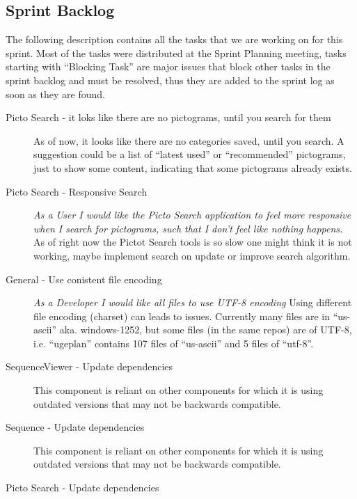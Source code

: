\subsection{Sprint Backlog}
The following description contains all the tasks that we are working on for this sprint.
Most of the tasks were distributed at the Sprint Planning meeting, tasks starting with ``Blocking Task'' are major issues that block other tasks in the sprint backlog and must be resolved, thus they are added to the sprint log as soon as they are found.

\begin{description}
    \item[Picto Search - it loks like there are no pictograms, until you search for them]
        As of now, it looks like there are no categories saved, until you search.
        A suggestion could be a list of ``latest used'' or ``recommended'' pictograms, just to show some content, indicating that some pictograms already exists.
    \item[Picto Search - Responsive Search]
        \textit{As a User I would like the Picto Search application to feel more responsive when I search for pictograms, such that I don't feel like nothing happens.}
        As of right now the Pictot Search tools is so slow one might think it is not working, maybe implement search on update or improve search algorithm.
    \item[General - Use conistent file encoding]
        \textit{As a Developer I would like all files to use UTF-8 encoding}
        Using different file encoding (charset) can leads to issues. 
        Currently many files are in ``us-ascii'' aka. windows-1252, but some files (in the same repos) are of UTF-8, i.e. ``ugeplan'' contains 107 files of ``us-ascii'' and 5 files of ``utf-8''. 
    \item[SequenceViewer - Update dependencies]
        This component is reliant on other components for which it is using outdated versions that may not be backwards compatible.
    \item[Sequence - Update dependencies]
        This component is reliant on other components for which it is using outdated versions that may not be backwards compatible.
    \item[Picto Search - Update dependencies] 

\end{description}
